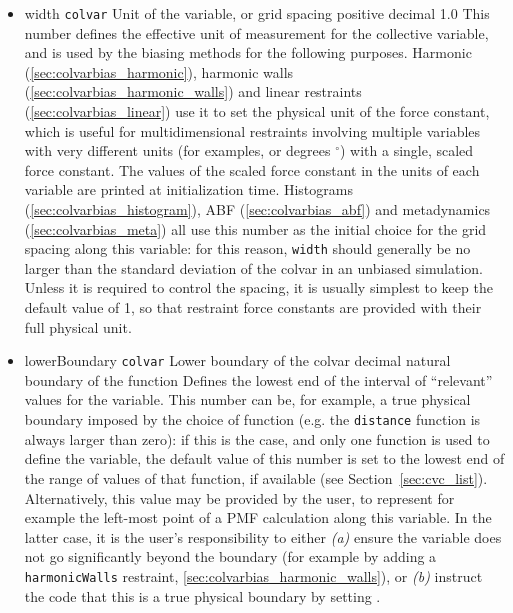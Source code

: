 \begin{itemize}

\item %
  \keydef
    {width}{%
    \texttt{colvar}}{%
    Unit of the variable, or grid spacing}{%
    positive decimal}{%
    1.0}{%
    This number defines the effective unit of measurement for the collective variable, and is used by the biasing methods for the following purposes.
    Harmonic (\ref{sec:colvarbias_harmonic}), harmonic walls (\ref{sec:colvarbias_harmonic_walls}) and linear restraints (\ref{sec:colvarbias_linear}) use it to set the physical unit of the force constant, which is useful for multidimensional restraints involving multiple variables with very different units (for examples, \lengthunit{} or degrees $^\circ$) with a single, scaled force constant.
    The values of the scaled force constant in the units of each variable are printed at initialization time.
    Histograms (\ref{sec:colvarbias_histogram}), ABF (\ref{sec:colvarbias_abf}) and metadynamics (\ref{sec:colvarbias_meta}) all use this number as the initial choice for the grid spacing along this variable: for this reason, \texttt{width} should generally be no larger than the standard deviation of the colvar in an unbiased simulation.
    Unless it is required to control the spacing, it is usually simplest to keep the default value of 1, so that restraint force constants are provided with their full physical unit.
  }

\item %
  \keydef
    {lowerBoundary}{%
    \texttt{colvar}}{%
    Lower boundary of the colvar}{%
    decimal}{%
    natural boundary of the function}{%
    Defines the lowest end of the interval of ``relevant'' values for the variable.
    This number can be, for example, a true physical boundary imposed by the choice of function (e.g.{} the \texttt{distance} function is always larger than zero): if this is the case, and only one function is used to define the variable, the default value of this number is set to the lowest end of the range of values of that function, if available (see Section~\ref{sec:cvc_list}).
    Alternatively, this value may be provided by the user, to represent for example the left-most point of a PMF calculation along this variable.
    In the latter case, it is the user's responsibility to either \emph{(a)} ensure the variable does not go significantly beyond the boundary (for example by adding a \texttt{harmonicWalls} restraint, \ref{sec:colvarbias_harmonic_walls}), or \emph{(b)} instruct the code that this is a true physical boundary by setting .
}


\end{itemize}
